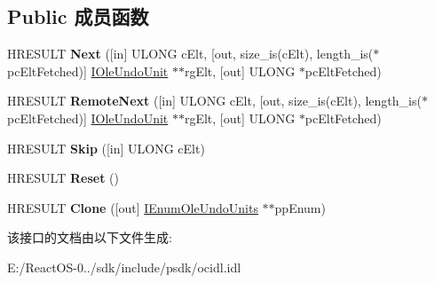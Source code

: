 \subsection*{Public 成员函数}
\begin{DoxyCompactItemize}
\item 
\mbox{\label{interface_i_enum_ole_undo_units_a4f5eb9d68f746c69b1d13c57f0f13de8}} 
H\+R\+E\+S\+U\+LT {\bfseries Next} (\mbox{[}in\mbox{]} U\+L\+O\+NG c\+Elt, \mbox{[}out, size\+\_\+is(c\+Elt), length\+\_\+is($\ast$pc\+Elt\+Fetched)\mbox{]} \hyperlink{interface_i_ole_undo_unit}{I\+Ole\+Undo\+Unit} $\ast$$\ast$rg\+Elt, \mbox{[}out\mbox{]} U\+L\+O\+NG $\ast$pc\+Elt\+Fetched)
\item 
\mbox{\label{interface_i_enum_ole_undo_units_a95c1ca105d6a24a28dc3a9af12611501}} 
H\+R\+E\+S\+U\+LT {\bfseries Remote\+Next} (\mbox{[}in\mbox{]} U\+L\+O\+NG c\+Elt, \mbox{[}out, size\+\_\+is(c\+Elt), length\+\_\+is($\ast$pc\+Elt\+Fetched)\mbox{]} \hyperlink{interface_i_ole_undo_unit}{I\+Ole\+Undo\+Unit} $\ast$$\ast$rg\+Elt, \mbox{[}out\mbox{]} U\+L\+O\+NG $\ast$pc\+Elt\+Fetched)
\item 
\mbox{\label{interface_i_enum_ole_undo_units_a1dfe3cf6fcdf002617572b3599ea6de4}} 
H\+R\+E\+S\+U\+LT {\bfseries Skip} (\mbox{[}in\mbox{]} U\+L\+O\+NG c\+Elt)
\item 
\mbox{\label{interface_i_enum_ole_undo_units_a678f1a6c4b3647a493eba798a13ffb8e}} 
H\+R\+E\+S\+U\+LT {\bfseries Reset} ()
\item 
\mbox{\label{interface_i_enum_ole_undo_units_a3bdeee097d2933fd1f4a8f928a57d545}} 
H\+R\+E\+S\+U\+LT {\bfseries Clone} (\mbox{[}out\mbox{]} \hyperlink{interface_i_enum_ole_undo_units}{I\+Enum\+Ole\+Undo\+Units} $\ast$$\ast$pp\+Enum)
\end{DoxyCompactItemize}


该接口的文档由以下文件生成\+:\begin{DoxyCompactItemize}
\item 
E\+:/\+React\+O\+S-\/0../sdk/include/psdk/ocidl.\+idl\end{DoxyCompactItemize}
